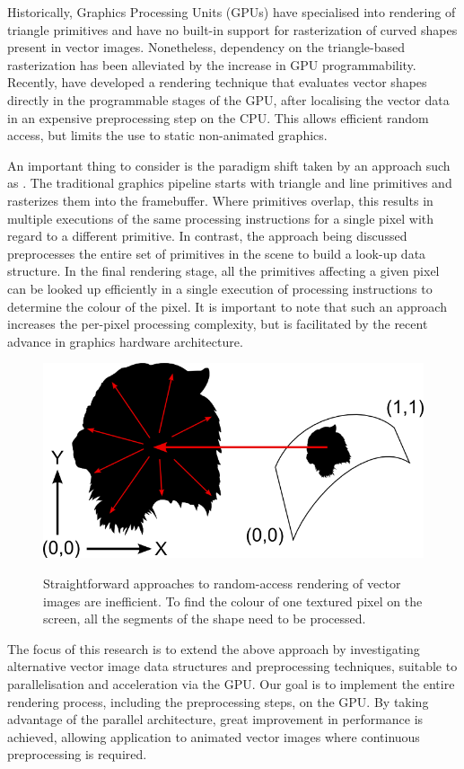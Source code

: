 \documentclass[11pt,a4paper,twoside]{article}
\begin{document}
Historically, Graphics Processing Units (GPUs) have specialised into rendering of triangle primitives and have no built-in support for rasterization of curved shapes present in vector images. Nonetheless, dependency on the triangle-based rasterization has been alleviated by the increase in GPU programmability. Recently, \cite{NehabHoppe08} have developed a rendering technique that evaluates vector shapes directly in the programmable stages of the GPU, after localising the vector data in an expensive preprocessing step on the CPU. This allows efficient random access, but limits the use to static non-animated graphics.

An important thing to consider is the paradigm shift taken by an approach such as \cite{NehabHoppe08}. The traditional graphics pipeline starts with triangle and line primitives and rasterizes them into the framebuffer. Where primitives overlap, this results in multiple executions of the same processing instructions for a single pixel with regard to a different primitive. In contrast, the approach being discussed preprocesses the entire set of primitives in the scene to build a look-up data structure. In the final rendering stage, all the primitives affecting a given pixel can be looked up efficiently in a single execution of processing instructions to determine the colour of the pixel. It is important to note that such an approach increases the per-pixel processing complexity, but is facilitated by the recent advance in graphics hardware architecture.

\begin {figure}
	\centering
	\includegraphics[width=0.60\columnwidth] {figures/random_access_vector} \label{fig:random_access_vector}
	\caption {Straightforward approaches to random-access rendering of vector images are inefficient. To find the colour of one textured pixel on the screen, all the segments of the shape need to be processed.}
	\label {fig:random_access_vector}
\end {figure}

The focus of this research is to extend the above approach by investigating alternative vector image data structures and preprocessing techniques, suitable to parallelisation and acceleration via the GPU. Our goal is to implement the entire rendering process, including the preprocessing steps, on the GPU. By taking advantage of the parallel architecture, great improvement in performance is achieved, allowing application to animated vector images where continuous preprocessing is required.
\end{document}
